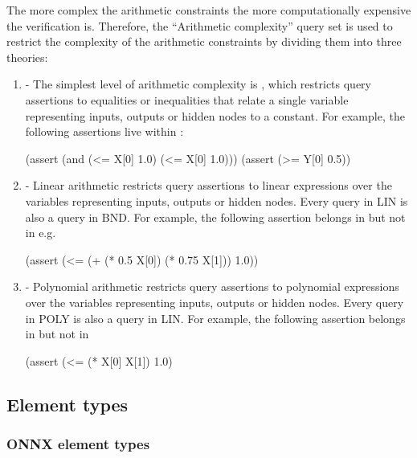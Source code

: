 The more complex the arithmetic constraints the more computationally expensive the verification is. Therefore, the ``Arithmetic complexity'' query set is used to restrict the complexity of the arithmetic constraints by dividing them into three theories:

\begin{enumerate}
\item \textbf{\bnd{}} - 
The simplest level of arithmetic complexity is \bnd{}, which restricts query assertions to equalities or inequalities that relate a single variable representing 
inputs, outputs or hidden nodes to a constant. For example, the following assertions live within \bnd{}:

\begin{code}[style=lbnf]
(assert (and (<= X[0] 1.0) (<= X[0] 1.0)))
(assert (>= Y[0] 0.5))
\end{code}

\item \textbf{\lin{}} - Linear arithmetic restricts query assertions to linear expressions over the variables representing inputs, outputs or hidden nodes. Every query in LIN is also a query in BND. For example, the following assertion belongs in \lin{} but not in \bnd{} e.g. 

\begin{code}[style=lbnf]
(assert (<= (+ (* 0.5 X[0]) (* 0.75 X[1])) 1.0))
\end{code}

\item \textbf{\poly{}} - Polynomial arithmetic restricts query assertions to polynomial expressions over the variables representing inputs, outputs or hidden nodes. 
Every query in POLY is also a query in LIN.
For example, the following assertion belongs in \poly{} but not in \lin{}

\begin{code}[style=lbnf]
(assert (<= (* X[0] X[1]) 1.0)
\end{code}

\end{enumerate}


\subsection{Element types}
\label{sec:element-types}

\subsubsection{ONNX element types}

